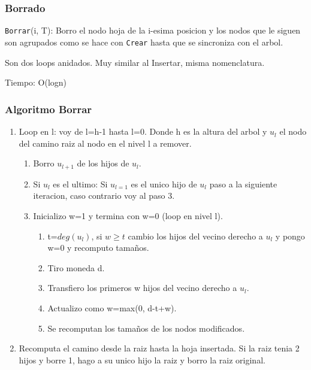 \documentclass[10pt,handout]{beamer}
\begin{document}
\section{}
\begin{frame}
\frametitle{Borrado}
\texttt{Borrar}(i, T): Borro el nodo hoja de la i-esima posicion y los nodos que le siguen son agrupados
  como se hace con  \texttt{Crear} hasta que se sincroniza con el arbol.

  Son dos loops anidados. Muy similar al Insertar, misma nomenclatura.

  Tiempo: O(logn)

\end{frame}

\begin{frame}
\frametitle{Algoritmo Borrar}

 \begin{enumerate}\itemsep-1em
  \item Loop en l: voy de l=h-1 hasta l=0.
    Donde h es la altura del arbol y $u_l$ el nodo del camino raiz al nodo en el nivel l a remover.
    \vspace{-0.4cm}
    \begin{enumerate}[a]\itemsep-1em
    \item Borro $u_{l+1}$ de los hijos de $u_l$.
    \item Si $u_l$ es el ultimo: Si $u_{l=1}$ es el unico hijo de $u_l$ paso a la siguiente iteracion, caso contrario
      voy al paso 3.
    \item Inicializo w=1 y termina con w=0 (loop en nivel l).
          \vspace{-0.4cm}
      \begin{enumerate}[i]\itemsep-1em
        \item t=$deg(u_l)$, si $w\geq t$ cambio los hijos del vecino derecho a $u_l$ y pongo w=0 y recomputo  tama\~nos.
        \item Tiro moneda d.
        \item Transfiero los  primeros w hijos del vecino derecho a $u_l$.
        \item Actualizo como w=max(0, d-t+w).
        \item Se recomputan los tama\~nos de los nodos modificados.
      \end{enumerate}
  \end{enumerate}
  \item  Recomputa el camino desde la raiz hasta la hoja insertada.
  Si la raiz tenia 2 hijos y borre 1, hago a su unico hijo la raiz y borro la raiz original.
\end{enumerate}
\end{frame}
\end{document}
